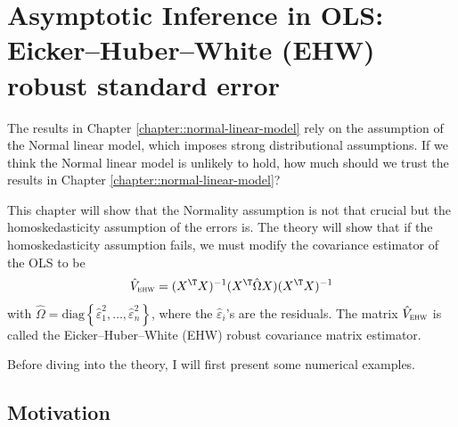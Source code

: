  
\chapter{Asymptotic Inference in OLS: Eicker--Huber--White (EHW) robust standard error}\label{chapter::EHW}



The results in Chapter \ref{chapter::normal-linear-model} rely on the assumption of the Normal linear model, which imposes strong distributional assumptions. If we think the Normal linear model is unlikely to hold, how much should we trust the results in Chapter \ref{chapter::normal-linear-model}? 


This chapter will show that the Normality assumption is not that crucial but the homoskedasticity assumption of the errors is. The theory will show that if the homoskedasticity assumption fails, we must modify the covariance estimator of the OLS to be
\begin{equation}\label{eq::ehw-first-appear}
\hat{V}_{\textsc{ehw}} =(X^{\T}X)^{-1}(X^{\T}\hat{\Omega}X)(X^{\T}X)^{-1}
\end{equation}
with $\hat{\Omega}=\text{diag}\left\{ \hat{\varepsilon}_{1}^{2},\ldots,\hat{\varepsilon}_{n}^{2}\right\} $, where the $\hat{\varepsilon}_i$'s are the residuals.  The matrix $\hat{V}_{\textsc{ehw}}$ is called the Eicker--Huber--White (EHW) robust covariance matrix estimator. 


Before diving into the theory, I will first present some numerical examples. 



\section{Motivation}


